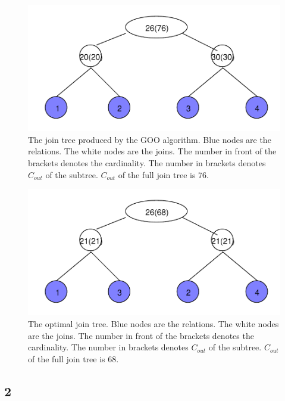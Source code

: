 \documentclass[11pt,a4paper]{scrartcl}
\begin{document}
\begin{figure}[H]
	\begin{center}
		\includegraphics{graphs/goo}
	\end{center}
	\caption{The join tree produced by the GOO algorithm. Blue nodes are the relations. The white nodes are the joins. The number in front of the brackets denotes the cardinality. The number in brackets denotes $C_{out}$ of the subtree. $C_{out}$ of the full join tree is 76.}
	\label{fig:goo}
\end{figure}

\begin{figure}[H]
	\begin{center}
		\includegraphics{graphs/optimal}
	\end{center}
	\caption{The optimal join tree. Blue nodes are the relations. The white nodes are the joins. The number in front of the brackets denotes the cardinality. The number in brackets denotes $C_{out}$ of the subtree. $C_{out}$ of the full join tree is 68.}
	\label{fig:optimal}
\end{figure}
	

\subsection*{2}
\end{document}
